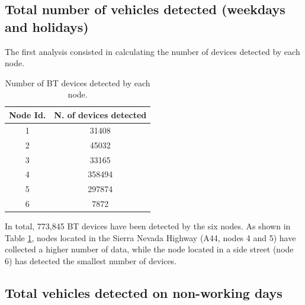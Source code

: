 \documentclass{llncs}
\begin{document}
\subsection{Total number of vehicles detected (weekdays and holidays)}

The first analysis consisted in calculating the number of devices detected by each node.

 \begin{table}
 \begin{center}
 \begin{tabular}{|c|c|}
 \hline
Node Id.  &  N. of devices detected  \\
 \hline
    1     &    31408  \\
 \hline
    2     &    45032  \\
 \hline
    3     &    33165  \\
 \hline
    4     &    358494  \\
 \hline
    5     &    297874  \\
 \hline
    6     &    7872  \\
 \hline
 \end{tabular}
 \end{center}
 \caption{Number of BT devices detected by each node.
 \label{VehiculosTotales}}
 \end{table}


In total, 773,845 BT devices have been detected by the six nodes.
As shown in Table \ref{VehiculosTotales}, nodes located in the Sierra Nevada Highway (A44, nodes 4 and 5) have collected a higher number of data, while the node located in a side street (node 6) has detected the smallest number of devices.


\subsection{Total vehicles detected on non-working days}
\end{document}

